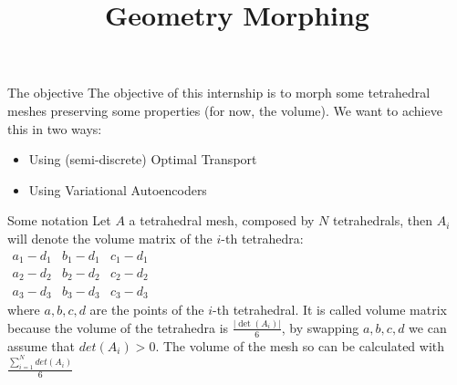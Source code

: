 \documentclass{beamer}
\title{Geometry Morphing}
\begin{document}
\frame{\titlepage}
\begin{frame}{The objective}
The objective of this internship is to morph some tetrahedral meshes preserving some properties (for now, the volume). We want to achieve this in two ways:
\begin{itemize}
\item Using (semi-discrete) Optimal Transport
\item Using Variational Autoencoders
\end{itemize}
\end{frame}
\begin{frame}{Some notation}
Let $A$ a tetrahedral mesh, composed by $N$ tetrahedrals, then $A_{i}$ will denote the volume matrix of the $i$-th tetrahedra:
\\
$\begin{array}{|ccc|}
a_{1}-d_{1} & b_{1}-d_{1} & c_{1}-d_{1} \\
a_{2}-d_{2}& b_{2}-d_{2} & c_{2}-d_{2} \\
a_{3}-d_{3} & b_{3}-d_{3} & c_{3}-d_{3} \end{array}$
\\
where $a,b,c,d$ are the points of the $i$-th tetrahedral. It is called volume matrix because the volume of the tetrahedra is $\frac{|\det(A_{i})|}{6}$, by swapping $a,b,c,d$ we can assume that $det(A_{i})>0$.
The volume of the mesh so can be calculated with $\frac{\sum_{i=1}^{N}det(A_{i})}{6}$
\end{frame}
\end{document}
